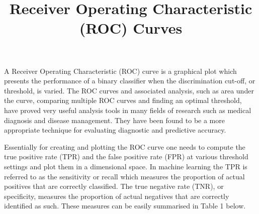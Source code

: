\documentclass[a4paper,justified]{tufte-handout}
\title{Receiver Operating Characteristic (ROC) Curves}
\author{}
\begin{document}
\maketitle

\begin{fullwidth}
\noindent A Receiver Operating Characteristic (ROC) curve is a graphical plot which presents the performance of a binary classifier when the discrimination cut-off, or threshold, is varied. The ROC curves and associated analysis, such as area under the curve, comparing multiple ROC curves and finding an optimal threshold, have proved very useful analysis tools in many fields of research such as medical diagnosis and disease management. They have been found to be a more appropriate technique for evaluating diagnostic and predictive accuracy.

\vspace{3mm}
\noindent Essentially for creating and plotting the ROC curve one needs to compute the true positive rate (TPR) and the false positive rate (FPR) at various threshold settings and plot them in a dimensional space. In machine learning the TPR is referred to as the sensitivity or recall which measures the proportion of actual positives that are correctly classified. The true negative rate (TNR), or specificity, measures the proportion of actual negatives that are correctly identified as such. These measures can be easily summarised in Table 1 below.


\end{fullwidth}
\end{document}
